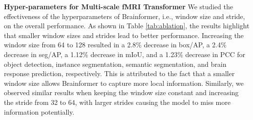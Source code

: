 \noindent
\textbf{Hyper-parameters for Multi-scale fMRI Transformer}
We studied the effectiveness of the hyperparameters of Brainformer, i.e., window size and stride, on the overall performance.
As shown in Table \ref{tab:ablation}, the results highlight that smaller window sizes and strides lead to better performance. Increasing the window size from 64 to 128 resulted in a 2.8\% decrease in box/AP, a 2.4\% decrease in seg/AP, a 1.12\% decrease in mIoU, and a 1.23\% decrease in PCC for object detection, instance segmentation, semantic segmentation, and brain response prediction, respectively. This is attributed to the fact that a smaller window size allows Brainformer to capture more local information. Similarly, we observed similar results when keeping the window size constant and increasing the stride from 32 to 64, with larger strides causing the model to miss more information potentially.


